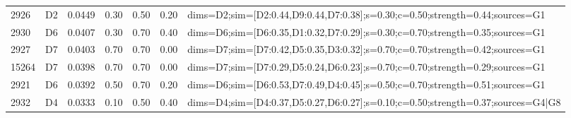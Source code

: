 \begin{table}[htbp]
\begin{tabular}{@{}lllllll@{}}
2926 & D2 & 0.0449 & 0.30 & 0.50 & 0.20 & dims=D2;sim=[D2:0.44,D9:0.44,D7:0.38];s=0.30;c=0.50;strength=0.44;sources=G1 \\
2930 & D6 & 0.0407 & 0.30 & 0.70 & 0.40 & dims=D6;sim=[D6:0.35,D1:0.32,D7:0.29];s=0.30;c=0.70;strength=0.35;sources=G1 \\
2927 & D7 & 0.0403 & 0.70 & 0.70 & 0.00 & dims=D7;sim=[D7:0.42,D5:0.35,D3:0.32];s=0.70;c=0.70;strength=0.42;sources=G1 \\
15264 & D7 & 0.0398 & 0.70 & 0.70 & 0.00 & dims=D7;sim=[D7:0.29,D5:0.24,D6:0.23];s=0.70;c=0.70;strength=0.29;sources=G1 \\
2921 & D6 & 0.0392 & 0.50 & 0.70 & 0.20 & dims=D6;sim=[D6:0.53,D7:0.49,D4:0.45];s=0.50;c=0.70;strength=0.51;sources=G1 \\
2932 & D4 & 0.0333 & 0.10 & 0.50 & 0.40 & dims=D4;sim=[D4:0.37,D5:0.27,D6:0.27];s=0.10;c=0.50;strength=0.37;sources=G4|G8 \\
\bottomrule
\end{tabular}
\end{table}